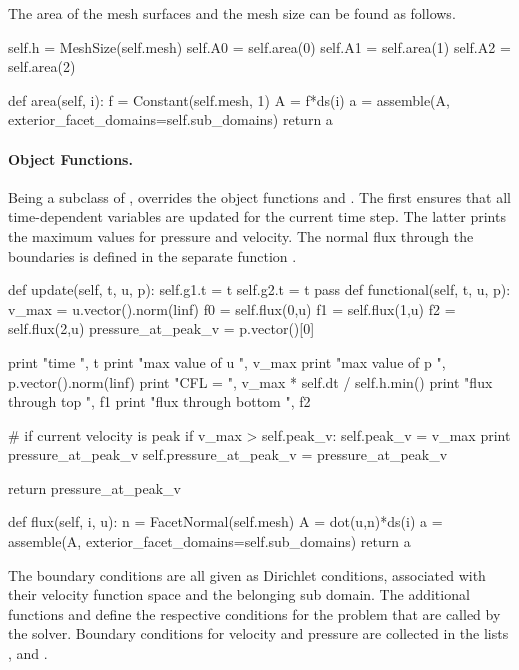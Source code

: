 The area of the mesh surfaces and the mesh size can be found as follows.
\begin{python}
self.h = MeshSize(self.mesh)
self.A0 = self.area(0)
self.A1 = self.area(1)
self.A2 = self.area(2)

def area(self, i):
	f = Constant(self.mesh, 1)
	A = f*ds(i)
	a = assemble(A, exterior_facet_domains=self.sub_domains)
	return a
\end{python}



\paragraph{Object Functions.} Being a subclass of ,  overrides the object functions  and . The first ensures that all time-dependent variables are updated for the current time step. The latter prints the maximum values for pressure and velocity. The normal flux through the boundaries is defined in the separate function .
\begin{python}
def update(self, t, u, p):
	self.g1.t = t
	self.g2.t = t
	pass
def functional(self, t, u, p):
	v_max = u.vector().norm(linf)
	f0 = self.flux(0,u)
	f1 = self.flux(1,u)
	f2 = self.flux(2,u)
	pressure_at_peak_v = p.vector()[0]

	print "time ", t
	print "max value of u ", v_max
	print "max value of p ", p.vector().norm(linf)
	print "CFL = ", v_max * self.dt / self.h.min()
	print "flux through top ", f1
	print "flux through bottom ", f2

	# if current velocity is peak
	if v_max >  self.peak_v:
		self.peak_v = v_max
		print pressure_at_peak_v
		self.pressure_at_peak_v = pressure_at_peak_v

	return pressure_at_peak_v

def flux(self, i, u):
	n = FacetNormal(self.mesh)
	A = dot(u,n)*ds(i)
	a = assemble(A, exterior_facet_domains=self.sub_domains)
	return a
\end{python}

The boundary conditions are all given as Dirichlet conditions,
associated with their velocity function space and the belonging sub
domain. The additional functions  and
 define the respective conditions for the
problem that are called by the solver. Boundary conditions for
velocity and pressure  are collected in the lists ,
 and .

